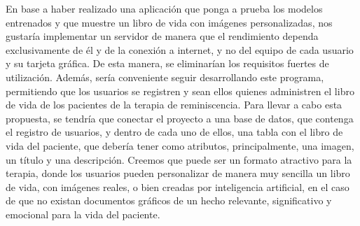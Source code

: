 En base a haber realizado una aplicación que ponga a prueba los modelos entrenados y que muestre un libro de vida con imágenes personalizadas, nos gustaría implementar un servidor de manera que el rendimiento dependa exclusivamente de él y de la conexión a internet, y no del equipo de cada usuario y su tarjeta gráfica. De esta manera, se eliminarían los requisitos fuertes de utilización. Además, sería conveniente seguir desarrollando este programa, permitiendo que los usuarios se registren y sean ellos quienes administren el libro de vida de los pacientes de la terapia de reminiscencia. Para llevar a cabo esta propuesta, se tendría que conectar el proyecto a una base de datos, que contenga el registro de usuarios, y dentro de cada uno de ellos, una tabla con el libro de vida del paciente, que debería tener como atributos, principalmente, una imagen, un título y una descripción. Creemos que puede ser un formato atractivo para la terapia, donde los usuarios pueden personalizar de manera muy sencilla un libro de vida, con imágenes reales, o bien creadas por inteligencia artificial, en el caso de que no existan documentos gráficos de un hecho relevante, significativo y emocional para la vida del paciente.


